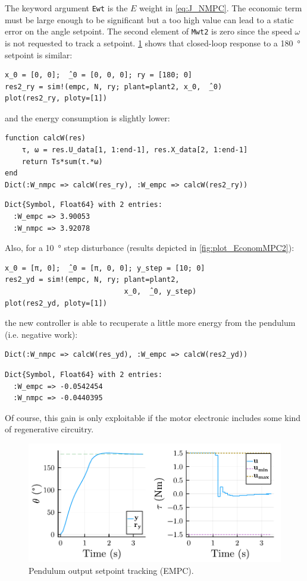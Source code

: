 The keyword argument \texttt{Ewt} is the $E$ weight in \eqref{eq:J_NMPC}. The economic term must be large enough to be significant but a too high value can lead to a static error on the angle setpoint. The second element of \texttt{Mwt2} is zero since the speed $\omega$ is not requested to track a setpoint. \cref{fig:plot_EconomMPC1} shows that closed-loop response to a \SI{180}{\degree} setpoint is similar:
\begin{verbatim}
x_0 = [0, 0];  ̂_0 = [0, 0, 0]; ry = [180; 0]
res2_ry = sim!(empc, N, ry; plant=plant2, x_0,  ̂_0)
plot(res2_ry, ploty=[1])
\end{verbatim}
and the energy consumption is slightly lower:
\begin{verbatim}
function calcW(res)
    τ, ω = res.U_data[1, 1:end-1], res.X_data[2, 1:end-1]
    return Ts*sum(τ.*ω)
end
Dict(:W_nmpc => calcW(res_ry), :W_empc => calcW(res2_ry))
\end{verbatim}
\spacerepl
\begin{verbatim}
Dict{Symbol, Float64} with 2 entries:
  :W_empc => 3.90053
  :W_nmpc => 3.92078
\end{verbatim}
Also, for a \SI{10}{\degree} step disturbance (results depicted in \cref{fig:plot_EconomMPC2}):
\begin{verbatim}
x_0 = [π, 0];  ̂_0 = [π, 0, 0]; y_step = [10; 0]
res2_yd = sim!(empc, N, ry; plant=plant2, 
                            x_0,  ̂_0, y_step)
plot(res2_yd, ploty=[1])
\end{verbatim}
the new controller is able to recuperate a little more energy from the pendulum (i.e. negative work):
\begin{verbatim}
Dict(:W_nmpc => calcW(res_yd), :W_empc => calcW(res2_yd))
\end{verbatim}
\spacerepl
\begin{verbatim}
Dict{Symbol, Float64} with 2 entries:
  :W_empc => -0.0542454
  :W_nmpc => -0.0440395
\end{verbatim}
Of course, this gain is only exploitable if the motor electronic includes some kind of regenerative circuitry.

\begin{figure}[ht]
    \centering
    \includegraphics[width=\columnwidth]{fig/plot_EconomMPC1.pdf}
    \caption{Pendulum output setpoint tracking (EMPC).}\label{fig:plot_EconomMPC1}
\end{figure}

